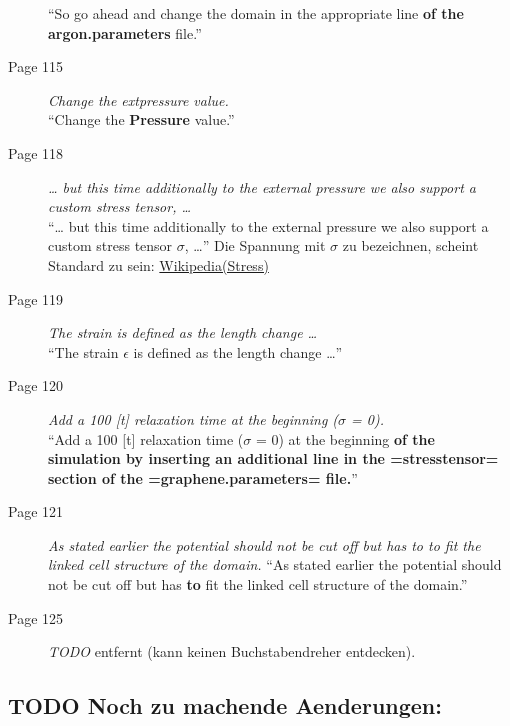 \documentclass[11pt]{article}
\begin{document}
\begin{description}
                  ``So go ahead and change the domain in the appropriate line \textbf{of the argon.parameters} file.''
\item [Page 115] \emph{Change the extpressure value.} \\
                  ``Change the \textbf{Pressure} value.''
\item [Page 118] \emph{\ldots{} but this time additionally to the external pressure we also support a custom stress tensor, \ldots{}} \\
                   ``\ldots{} but this time additionally to the external pressure we also support a custom stress tensor $\sigma$, \ldots{}''
                   Die Spannung mit $\sigma$ zu bezeichnen, scheint Standard zu sein: \href{http://en.wikipedia.org/wiki/Stress_%28mechanics%29}{Wikipedia(Stress)}
\item [Page 119] \emph{The strain is defined as the length change \ldots{}} \\
                   ``The strain $\epsilon$ is defined as the length change \ldots{}''
\item [Page 120] \emph{Add a 100 [t] relaxation time at the beginning ($\sigma$ = 0).} \\
                   ``Add a 100 [t] relaxation time ($\sigma$ = 0) at the beginning \textbf{of the simulation by inserting an additional line in the =stresstensor= section of the =graphene.parameters= file.}''
\item [Page 121] \emph{As stated earlier the potential should not be cut off but has to to fit the linked cell structure of the domain.}
                   ``As stated earlier the potential should not be cut off but has \textbf{to} fit the linked cell structure of the domain.''
\item [Page 125] \emph{TODO} entfernt (kann keinen Buchstabendreher entdecken).
\end{description}
\subsection{\textbf{TODO} Noch zu machende Aenderungen:}
\label{sec-1.2}
\end{document}

